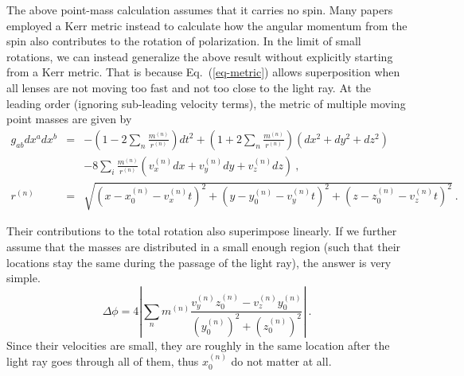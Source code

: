 \documentclass[aps,showpacs,onecolumn,floats,prd,superscriptaddress,nofootinbib]{revtex4}
\begin{document}
The above point-mass calculation assumes that it carries no spin. 
Many papers employed a Kerr metric instead to calculate how the angular momentum from the spin also contributes to the rotation of polarization. 
In the limit of small rotations, we can instead generalize the above result without explicitly starting from a Kerr metric. 
That is because Eq.~(\ref{eq-metric}) allows superposition when all lenses are not moving too fast and not too close to the light ray. 
At the leading order (ignoring sub-leading velocity terms), the metric of multiple moving point masses are given by
\begin{eqnarray}
g_{ab}dx^adx^b &=& -\left( 1 - 2\sum_n \frac{m^{(n)}}{r^{(n)}} \right)dt^2
+\left( 1 + 2\sum_n \frac{m^{(n)}}{r^{(n)}} \right)(dx^2+dy^2+dz^2)
\\ \nonumber 
& & -8\sum_i \frac{m^{(n)} }{r^{(n)}}
\left(v^{(n)}_x dx + v^{(n)}_y dy+ v^{(n)}_z dz\right)~, \\
r^{(n)} &=& \sqrt{\left(x - x_0^{(n)} - v^{(n)}_x t\right)^2 + \left(y - y_0^{(n)} - v^{(n)}_y t\right)^2 
+ \left(z - z_0^{(n)} - v^{(n)}_z t\right)^2}~.
\end{eqnarray}

Their contributions to the total rotation also superimpose linearly. 
If we further assume that the masses are distributed in a small enough region (such that their locations stay the same during the passage of the light ray), the answer is very simple. 
\begin{equation}
\Delta\phi = 4 \left| \sum_n m^{(n)} \frac{v_y^{(n)}z_0^{(n)} - v_z^{(n)}y_0^{(n)}}
{\left(y_0^{(n)}\right)^2+\left(z_0^{(n)}\right)^2} \right|~.
\label{eq-combine}
\end{equation}
Since their velocities are small, they are roughly in the same location after the light ray goes through all of them, thus $x_0^{(n)}$ do not matter at all. 
\end{document}
